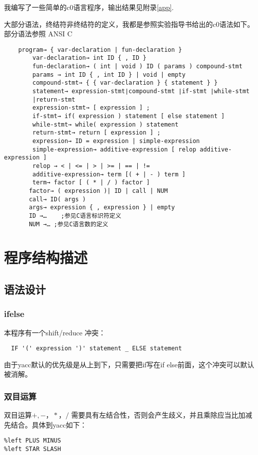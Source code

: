 \documentclass{article}
\begin{document}
\begin{CJK}{UTF8}{gkai}
我编写了一些简单的c0语言程序，输出结果见附录\ref{app}.

大部分语法，终结符非终结符的定义，我都是参照实验指导书给出的c0语法如下。部分语法参照 ANSI C \cite{ansic}
\begin{verbatim}
    program→ { var-declaration | fun-declaration }
        var-declaration→ int ID { , ID }    
        fun-declaration→ ( int | void ) ID ( params ) compound-stmt
        params → int ID { , int ID } | void | empty
        compound-stmt→ { { var-declaration } { statement } }
        statement→ expression-stmt∣compound-stmt ∣if-stmt ∣while-stmt 
        |return-stmt 
        expression-stmt→ [ expression ] ; 
        if-stmt→ if( expression ) statement [ else statement ]
        while-stmt→ while( expression ) statement 
        return-stmt→ return [ expression ] ;
        expression→ ID = expression | simple-expression
        simple-expression→ additive-expression [ relop additive-expression ]
        relop → < | <= | > | >= | == | != 
        additive-expression→ term [( + | - ) term ]
        term→ factor [ ( * | / ) factor ]
       factor→ ( expression )| ID | call | NUM
       call→ ID( args ) 
       args→ expression { , expression } | empty
       ID →…	;参见C语言标识符定义
       NUM →… ;参见C语言数的定义
\end{verbatim}

\section{程序结构描述}
\subsection{语法设计}
\subsubsection{ifelse}
本程序有一个shift/reduce 冲突：
\begin{verbatim}
  IF '(' expression ')' statement _ ELSE statement
\end{verbatim}
由于yacc默认的优先级是从上到下，只需要把if写在if else前面，这个冲突可以默认被消解。
\subsubsection{双目运算}
双目运算$+,-，*，/$ 需要具有左结合性，否则会产生歧义，并且乘除应当比加减先结合。具体到yacc如下：
\begin{verbatim}
%left PLUS MINUS
%left STAR SLASH
\end{verbatim}


\end{CJK}
\end{document}
